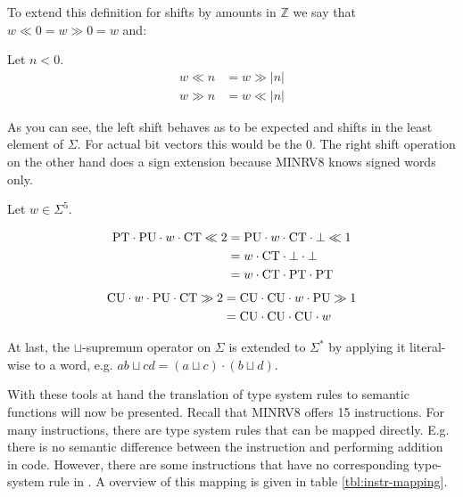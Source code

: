 To extend this definition for shifts by amounts in $ \mathbb{Z} $ we say that $ w \ll 0 = w \gg 0 = w $ and:

Let $ n < 0 $.
\begin{align*}
    w \ll n &= w \gg |n| \\
    w \gg n &= w \ll |n|
\end{align*}

As you can see, the left shift behaves as to be expected and shifts in the least element of $ \Sigma $.
For actual bit vectors this would be the 0.
The right shift operation on the other hand does a sign extension because MINRV8 knows signed words only.

\begin{example}
    Let $ w \in \Sigma^5 $.

    \begin{align*}
        \text{PT} \cdot \text{PU} \cdot w \cdot \text{CT} \ll 2 &= \text{PU} \cdot w \cdot \text{CT} \cdot \bot \ll 1 \\
        &= w \cdot \text{CT} \cdot \bot \cdot \bot \\
        &= w \cdot \text{CT} \cdot \text{PT} \cdot \text{PT}
    \end{align*}
    \begin{align*}
        \text{CU} \cdot w \cdot \text{PU} \cdot \text{CT} \gg 2 &= \text{CU} \cdot \text{CU} \cdot w \cdot \text{PU} \gg 1 \\
        &= \text{CU} \cdot \text{CU} \cdot \text{CU} \cdot w
    \end{align*}
\end{example}

At last, the $ \sqcup $-supremum operator on $ \Sigma $ is extended to $ \Sigma^* $ by applying it literal-wise to a word, e.g. $ ab \sqcup cd = (a \sqcup c) \cdot (b \sqcup d) $.

With these tools at hand the translation of type system rules to semantic functions will now be presented.
Recall that MINRV8 offers 15 instructions.
For many instructions, there are type system rules that can be mapped directly.
E.g. there is no semantic difference between the  instruction and performing addition in code.
However, there are some instructions that have no corresponding type-system rule in \cite{Ferraiuolo17}.
A overview of this mapping is given in table \ref{tbl:instr-mapping}.

